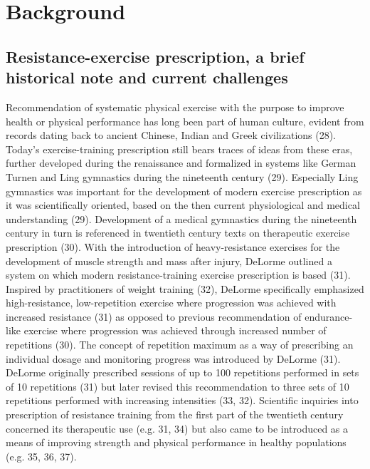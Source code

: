 \documentclass[twoside,10pt]{gihclass} %
\begin{document}
\hypertarget{background}{%
\chapter{Background}\label{background}}

\hypertarget{resistance-exercise-prescription-a-brief-historical-note-and-current-challenges}{%
\section{Resistance-exercise prescription, a brief historical note and current challenges}\label{resistance-exercise-prescription-a-brief-historical-note-and-current-challenges}}

Recommendation of systematic physical exercise with the purpose to improve health or physical performance has long been part of human culture, evident from records dating back to ancient Chinese, Indian and Greek civilizations
(28).
Today's exercise-training prescription still bears traces of ideas from these eras, further developed during the renaissance and formalized in systems like German Turnen and Ling gymnastics during the nineteenth century
(29).
Especially Ling gymnastics was important for the development of modern exercise prescription as it was scientifically oriented, based on the then current physiological and medical understanding (29).
Development of a medical gymnastics during the nineteenth century in turn is referenced in twentieth century texts on therapeutic exercise prescription
(30).
With the introduction of heavy-resistance exercises for the development of muscle strength and mass after injury, DeLorme outlined a system on which modern resistance-training exercise prescription is based (31).
Inspired by practitioners of weight training (32),
DeLorme specifically emphasized high-resistance, low-repetition exercise where progression was achieved with increased resistance (31) as opposed to previous recommendation of endurance-like exercise where progression was achieved through increased number of repetitions
(30).
The concept of repetition maximum as a way of prescribing an individual dosage and monitoring progress was introduced by DeLorme (31).
DeLorme originally prescribed sessions of up to 100 repetitions performed in sets of 10 repetitions (31) but later revised this recommendation to three sets of 10 repetitions performed with increasing intensities
(33, 32).
Scientific inquiries into prescription of resistance training from the first part of the twentieth century concerned its therapeutic use
(e.g. 31, 34)
but also came to be introduced as a means of improving strength and physical performance in healthy populations
(e.g. 35, 36, 37).
\end{document}
